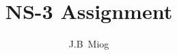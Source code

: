 \documentclass[whitelogo]{tudelft-report}
\begin{document}
\frontmatter


\title[tudelft-white]{NS-3 Assignment} 
\subtitle[tudelft-black]{}
\author[tudelft-white]{J.B\ Miog}
\makecover[split]




%

\tableofcontents

\mainmatter



 



\appendix

%


\end{document}
